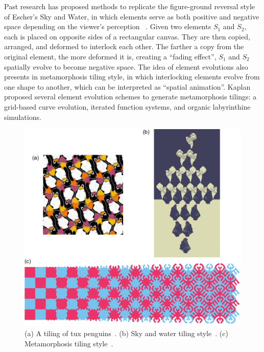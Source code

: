 
\nnewtext
{
Past research has proposed methods
to replicate the figure-ground reversal style of Escher's Sky and Water,
in which elements serve as both positive and negative space depending 
on the viewer's perception~\cite{Kaplan2004, Sugihara2009, Lin2018} .
Given two elements $S_1$ and $S_2$, each is placed on opposite sides of a rectangular canvas.
They are then copied, arranged, and deformed to interlock each other.
The farther a copy from the original element, the more deformed it is, 
creating a ``fading effect'', $S_1$ and $S_2$ spatially evolve to become negative space.
The idea of element evolutions also presents in metamorphosis tiling style,
in which interlocking elements evolve from one shape to another,
which can be interpreted as ``spatial animation''.
Kaplan~\cite{Kaplan2010} proposed several element evolution schemes to generate metamorphosis tilings:
a grid-based curve evolution, iterated function systems, and organic labyrinthine simulations.
}

\begin{figure}
\centering
\includegraphics[width=1.0\textwidth]{figures/related/tilings.pdf} 
\caption[Tilings]
{\label{fig_related_escherization} 
\newtext
{
(a) A tiling of tux penguins~\cite{Kaplan2000}.
(b) Sky and water tiling style~\cite{Kaplan2004}.
(c) Metamorphosis tiling style~\cite{Kaplan2010}.
}
}
\end{figure}


